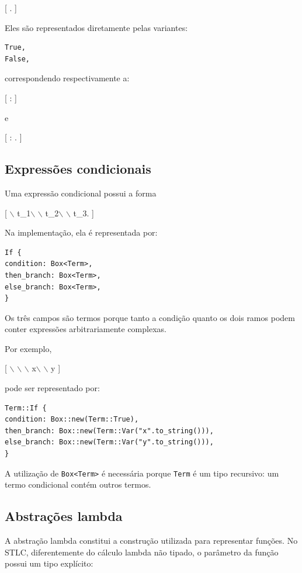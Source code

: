 \documentclass[11pt]{article}
\begin{document}
{[}
\qquad
{}.
]

Eles são representados diretamente pelas variantes:

\begin{verbatim}
True,
False,
\end{verbatim}

correspondendo respectivamente a:

{[}
 : 
]

e

{[}
 : .
]
\subsection{Expressões condicionais}
\label{sec:org3908273}

Uma expressão condicional possui a forma

{[}
$\backslash$ t\_1$\backslash$ $\backslash$ t\_2$\backslash$ $\backslash$ t\_3.
]

Na implementação, ela é representada por:

\begin{verbatim}
If {
condition: Box<Term>,
then_branch: Box<Term>,
else_branch: Box<Term>,
}
\end{verbatim}

Os três campos são termos porque tanto a condição quanto os dois ramos
podem conter expressões arbitrariamente complexas.

Por exemplo,

{[}
$\backslash$ $\backslash$ $\backslash$ x$\backslash$ $\backslash$ y
]

pode ser representado por:

\begin{verbatim}
Term::If {
condition: Box::new(Term::True),
then_branch: Box::new(Term::Var("x".to_string())),
else_branch: Box::new(Term::Var("y".to_string())),
}
\end{verbatim}

A utilização de \texttt{Box<Term>} é necessária porque \texttt{Term} é um tipo recursivo:
um termo condicional contém outros termos.
\subsection{Abstrações lambda}
\label{sec:org37a4b88}

A abstração lambda constitui a construção utilizada para representar
funções. No STLC, diferentemente do cálculo lambda não tipado, o parâmetro
da função possui um tipo explícito:
\end{document}
